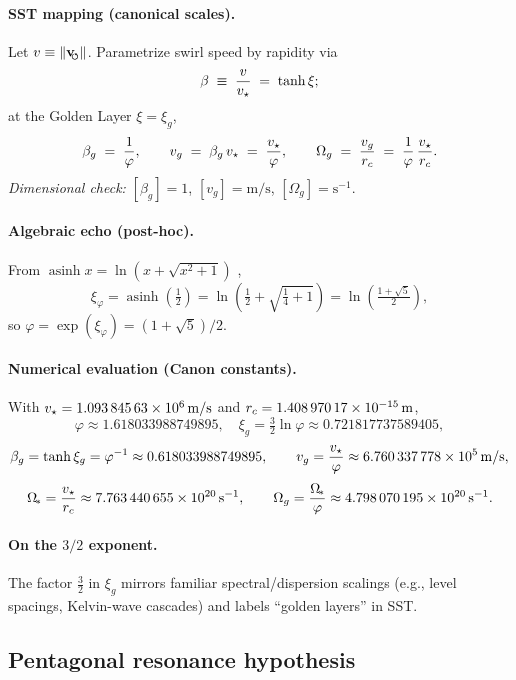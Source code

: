 \documentclass[11pt, preprint,titlepage]{revtex4-2}
\newcommand{\swirlarrow}{\!\!\scriptsize\boldsymbol{\circlearrowleft}}
\newcommand{\vswirl}{\mathbf{v}_{\swirlarrow}}
\begin{document}
	\paragraph*{SST mapping (canonical scales).}
	Let \(v\equiv\|\vswirl\|\). Parametrize swirl speed by rapidity via
	\[
		\beta \;\equiv\; \frac{v}{v_\star} \;=\; \tanh\xi;
	\]
	at the Golden Layer \(\xi=\xi_g\),
	\[
		\beta_g \;=\; \frac{1}{\varphi},\qquad
		v_g \;=\; \beta_g\,v_\star \;=\; \frac{v_\star}{\varphi},\qquad
		\Omega_g \;=\; \frac{v_g}{r_c} \;=\; \frac{1}{\varphi}\,\frac{v_\star}{r_c}.
	\]
	\emph{Dimensional check:} \([\beta_g]=1\), \([v_g]=\mathrm{m/s}\), \([\Omega_g]=\mathrm{s}^{-1}\).

	\paragraph*{Algebraic echo (post-hoc).}
	From \(\operatorname{asinh}x=\ln(x+\sqrt{x^2+1})\) \cite{NISTDLMF},
	\[
		\xi_\varphi=\operatorname{asinh}\!\left(\tfrac{1}{2}\right)
		=\ln\!\left(\tfrac{1}{2}+\sqrt{\tfrac{1}{4}+1}\right)
		=\ln\!\left(\tfrac{1+\sqrt5}{2}\right),
	\]
	so \(\varphi=\exp(\xi_\varphi)=(1+\sqrt5)/2\).

	\paragraph*{Numerical evaluation (Canon constants).}
	With \(v_\star=\SI{1.09384563e6}{m/s}\) and \(r_c=\SI{1.40897017e-15}{m}\),
	\[
		\varphi \approx 1.618033988749895,\quad
		\xi_g=\tfrac{3}{2}\ln\varphi \approx 0.721817737589405,
	\]
	\[
		\beta_g=\tanh\xi_g=\varphi^{-1}\approx 0.618033988749895,\qquad
		v_g=\frac{v_\star}{\varphi}\approx \SI{6.760337778e5}{m/s},
	\]
	\[
		\Omega_{\!*}=\frac{v_\star}{r_c}\approx \SI{7.763440655e20}{s^{-1}},\qquad
		\Omega_g=\frac{\Omega_{\!*}}{\varphi}\approx \SI{4.798070195e20}{s^{-1}}.
	\]

	\paragraph*{On the \(3/2\) exponent.}
	The factor \(\tfrac{3}{2}\) in \(\xi_g\) mirrors familiar spectral/dispersion scalings (e.g., level spacings, Kelvin-wave cascades) and labels “golden layers” in SST.

	\subsection{Pentagonal resonance hypothesis}
\end{document}
